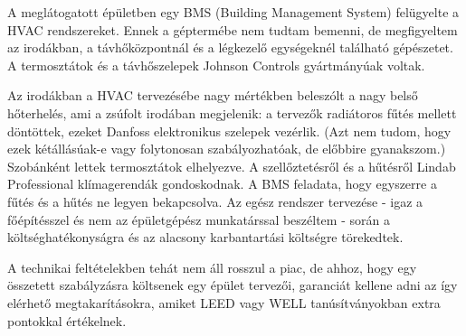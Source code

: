 A meglátogatott épületben egy BMS (Building Management System) felügyelte a HVAC rendszereket. Ennek a géptermébe nem tudtam bemenni, de megfigyeltem az irodákban, a távhőközpontnál és a légkezelő egységeknél található gépészetet. A termosztátok és a távhőszelepek Johnson Controls gyártmányúak voltak.

Az irodákban a HVAC tervezésébe nagy mértékben beleszólt a nagy belső hőterhelés, ami a zsúfolt irodában megjelenik: a tervezők radiátoros fűtés mellett döntöttek, ezeket Danfoss elektronikus szelepek vezérlik. (Azt nem tudom, hogy ezek kétállásúak-e vagy folytonosan szabályozhatóak, de előbbire gyanakszom.) Szobánként lettek termosztátok elhelyezve. A szellőztetésről és a hűtésről Lindab Professional klímagerendák gondoskodnak. A BMS feladata, hogy egyszerre a fűtés és a hűtés ne legyen bekapcsolva. Az egész rendszer tervezése - igaz a főépítésszel és nem az épületgépész munkatárssal beszéltem - során a költséghatékonyságra és az alacsony karbantartási költségre törekedtek.

A technikai feltételekben tehát nem áll rosszul a piac, de ahhoz, hogy egy összetett szabályzásra költsenek egy épület tervezői, garanciát kellene adni az így elérhető megtakarításokra, amiket LEED vagy WELL tanúsítványokban extra pontokkal értékelnek.

